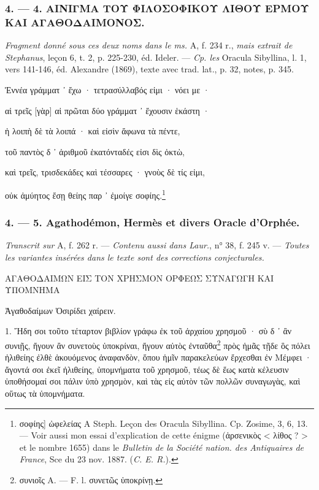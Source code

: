 \documentclass[a4paper, 11pt, oneside, polutonikogreek, french]{article}
\begin{document}
\bigskip
\centerline{\EightStarTaper}
\centerline{\EightStarTaper\EightStarTaper}
\bigskip

\subsubsection{4. --- 4. ΑΙΝΙΓΜΑ ΤΟΥ ΦΙΛΟΣΟΦΙΚΟΥ ΛΙΘΟΥ ΕΡΜΟΥ ΚΑΙ ΑΓΑΘΟΔΑΙΜΟΝΟΣ.}

\emph{Fragment donné sous ces deux noms dans le ms.} A, f. 234 r., \emph{mais extrait de Stephanus}, leçon 6, t. 2, p. 225-230, éd. Ideler. --- \emph{Cp. les} Oracula Sibyllina, l. 1, vers 141-146, éd. Alexandre (1869), texte avec trad. lat., p. 32, notes, p. 345.

\bigskip

Ἐννέα γράμματ ᾽ ἔχω · τετρασύλλαβός εἰμι · νόει με ·

αἱ τρεῖς [γὰρ] αἱ πρῶται δύο γράμματ ᾽ ἔχουσιν ἑκάστη ·

ἡ λοιπὴ δὲ τὰ λοιπά · καὶ εἰσὶν ἄφωνα τὰ πέντε,

τοῦ παντὸς δ ᾽ ἀριθμοῦ ἑκατόνταδές εἰσι δὶς ὀκτὼ,

καὶ τρεῖς, τρισδεκάδες καὶ τέσσαρες · γνοὺς δὲ τίς εἰμι,

οὐκ ἀμύητος ἔσῃ θείης παρ ᾽ ἐμοίγε σοφίης.\footnote{σοφίης] ὠφελείας A Steph. Leçon des Oracula Sibyllina. Cp. Zosime, 3, 6, 13. --- Voir aussi mon essai d'explication de cette énigme (ἀρσενικὸς < λίθος ? > et le nombre 1655) dans le \emph{Bulletin de la Société nation. des Antiquaires de France}, Sce du 23 nov. 1887. (\emph{C. E. R.}).}

\bigskip
\centerline{\EightStarTaper}
\centerline{\EightStarTaper\EightStarTaper}
\bigskip

\subsubsection{4. --- 5. Agathodémon, Hermès et divers Oracle d'Orphée.}

\emph{Transcrit sur} A, f. 262 r. --- \emph{Contenu aussi dans Laur.}, n° 38, f. 245 v. --- \emph{Toutes les variantes insérées dans le texte sont des corrections conjecturales.}

\bigskip

ΑΓΑΘΟΔΑΙΜΩΝ ΕΙΣ ΤΟΝ ΧΡΗΣΜΟΝ ΟΡΦΕΩΣ ΣΥΝΑΓΩΓΗ ΚΑΙ ΥΠΟΜΝΗΜΑ

Ἀγαθοδαίμων Ὀσιρίδει χαίρειν.

1. Ἤδη σοι τοῦτο τέταρτον βιβλίον γράφω ἐκ τοῦ ἀρχαίου χρησμοῦ · σὺ δ ᾽ ἂν συνιῇς, ἤγουν ἂν συνετοὺς ὑποκρίναι, ἤγουν αὐτὸς ἐνταῦθα\footnote{συνιοῖς A. --- F. l. συνετῶς ὑποκρίνῃ.} πρὸς ἡμᾶς τῇδε ὃς πόλει ἠλιθείης ἐλθὲ ἀκουόμενος ἀναφανδὸν, ὅπου ἡμῖν παρακελεύων ἔρχεσθαι ἐν Μέμφει · ἄγοντά σοι ἐκεῖ ἠλιθείης, ὑπομνήματα τοῦ χρησμοῦ, τέως δὲ ἕως κατὰ κέλευσιν ὑποθήσομαί σοι πάλιν ὑπὸ χρησμὸν, καὶ τὰς εἰς αὐτὸν τῶν πολλῶν συναγωγὰς, καὶ οὕτως τὰ ὑπομνήματα.
\end{document}
